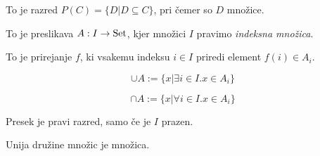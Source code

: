 
To je razred $P(C) = \{D | D \subseteq C\}$, pri čemer so $D$ množice.


To je preslikava $A: I \to \text{Set}$, kjer množici $I$ pravimo \textit{indeksna množica}.


To je prirejanje $f$, ki vsakemu indeksu $i \in I$ priredi element $f(i) \in A_i$.


\[
	\cup A := \{x | \exists i \in I. x\in A_i\}
\]

\[
	\cap A := \{x | \forall i \in I. x\in A_i\}
\]

Presek je pravi razred, samo če je $I$ prazen.


Unija družine množic je množica.